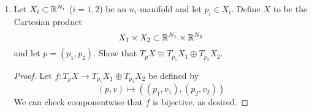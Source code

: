 \documentclass[../psets.tex]{subfiles}
\begin{document}
\begin{enumerate}[label={\textbf{4.2.\roman*.}}]
\begin{proof}
    \end{proof}
    \item Let $X_i\subset\mathbb{R}^{N_i}$ ($i=1,2$) be an $n_i$-manifold and let $p_i\in X_i$. Define $X$ to be the Cartesian product
    \begin{equation*}
        X_1\times X_2 \subset\mathbb{R}^{N_1}\times\mathbb{R}^{N_2}
    \end{equation*}
    and let $p=(p_1,p_2)$. Show that $T_pX\cong T_{p_1}X_1\oplus T_{p_2}X_2$.
    \begin{proof}
        Let $f:T_pX\to T_{p_1}X_1\oplus T_{p_2}X_2$ be defined by
        \begin{equation*}
            (p,v) \mapsto ((p_1,v_1),(p_2,v_2))
        \end{equation*}
        We can check componentwise that $f$ is bijective, as desired.
    \end{proof}
\end{enumerate}
\end{document}

